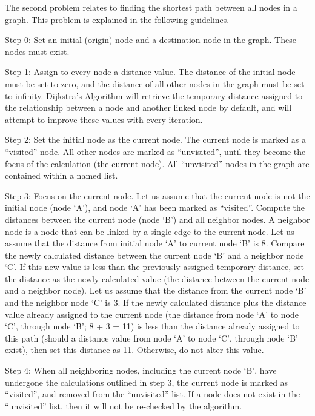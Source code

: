 \documentclass[12pt]{article}   	%
\begin{document}
\noindent
The second problem relates to finding the shortest path between all nodes in a graph. This problem is explained in the following guidelines.

\noindent
Step 0: Set an initial (origin) node and a destination node in the graph. These nodes must exist.

\noindent
Step 1: Assign to every node a distance value. The distance of the initial node must be set to zero, and the distance of all other nodes in the graph must be set to infinity. Dijkstra’s Algorithm will retrieve the temporary distance assigned to the relationship between a node and another linked node by default, and will attempt to improve these values with every iteration.

\noindent
Step 2: Set the initial node as the current node. The current node is marked as a “visited” node. All other nodes are marked as “unvisited”, until they become the focus of the calculation (the current node). All “unvisited” nodes in the graph are contained within a named list.

\noindent
Step 3: Focus on the current node. Let us assume that the current node is not the initial node (node ‘A’), and node ‘A’ has been marked as “visited”. Compute the distances between the current node (node ‘B’) and all neighbor nodes. A neighbor node is a node that can be linked by a single edge to the current node. Let us assume that the distance from initial node ‘A’ to current node ‘B’ is 8. Compare the newly calculated distance between the current node ‘B’ and a neighbor node ‘C’. If this new value is less than the previously assigned temporary distance, set the distance as the newly calculated value (the distance between the current node and a neighbor node). Let us assume that the distance from the current node ‘B’ and the neighbor node ‘C’ is 3. If the newly calculated distance plus the distance value already assigned to the current node (the distance from node ‘A’ to node ‘C’, through node ‘B’; 8 + 3 = 11) is less than the distance already assigned to this path (should a distance value from node ‘A’ to node ‘C’, through node ‘B’ exist), then set this distance as 11. Otherwise, do not alter this value.

\noindent
Step 4: When all neighboring nodes, including the current node ‘B’, have undergone the calculations outlined in step 3, the current node is marked as “visited”, and removed from the “unvisited” list. If a node does not exist in the “unvisited” list, then it will not be re-checked by the algorithm.
\end{document}
